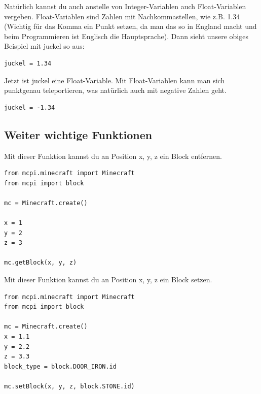 Natürlich kannst du auch anstelle von Integer-Variablen auch Float-Variablen vergeben. Float-Variablen sind Zahlen mit Nachkommastellen, wie z.B. 1.34 (Wichtig für das Komma ein Punkt setzen, da man das so in England macht und beim Programmieren ist Englisch die Hauptsprache). Dann sieht unsere obiges Beispiel mit juckel so aus:
\lstset{language=Python}
\lstset{frame=lines}
\lstset{basicstyle=\footnotesize}
\begin{lstlisting}
juckel = 1.34
\end{lstlisting}
Jetzt ist juckel eine Float-Variable. Mit Float-Variablen kann man sich punktgenau teleportieren, was natürlich auch mit negative Zahlen geht. 
\lstset{language=Python}
\lstset{frame=lines}
\lstset{basicstyle=\footnotesize}
\begin{lstlisting}
juckel = -1.34
\end{lstlisting}

\subsection{Weiter wichtige Funktionen}


Mit dieser Funktion kannst du an Position x, y, z ein Block entfernen.
\lstset{language=Python}
\lstset{frame=lines}
\lstset{basicstyle=\footnotesize}
\begin{lstlisting}
from mcpi.minecraft import Minecraft
from mcpi import block

mc = Minecraft.create()

x = 1
y = 2
z = 3

mc.getBlock(x, y, z)
\end{lstlisting}

Mit dieser Funktion kannst du an Position x, y, z ein Block setzen.
\lstset{language=Python}
\lstset{frame=lines}
\lstset{basicstyle=\footnotesize}
\begin{lstlisting}
from mcpi.minecraft import Minecraft
from mcpi import block

mc = Minecraft.create()
x = 1.1
y = 2.2
z = 3.3
block_type = block.DOOR_IRON.id

mc.setBlock(x, y, z, block.STONE.id)
\end{lstlisting}


